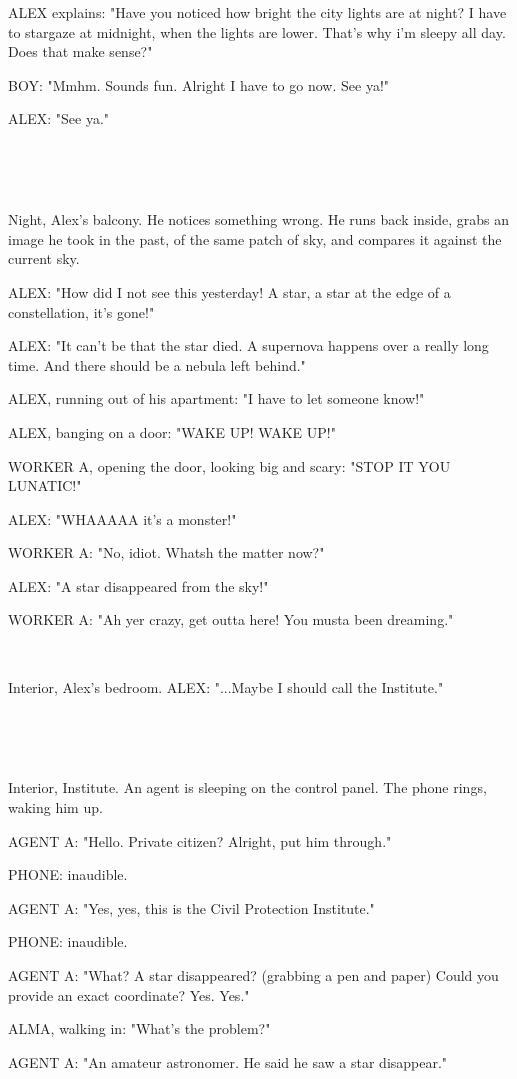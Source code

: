 \documentclass[11pt]{article}
\begin{document}
ALEX explains: "Have you noticed how bright the city lights are at night?
I have to stargaze at midnight, when the lights are lower.
That's why i'm sleepy all day.
Does that make sense?"

BOY: "Mmhm. Sounds fun.
Alright I have to go now. See ya!"

ALEX: "See ya."

\ 

\ 

Night, Alex's balcony.
He notices something wrong.
He runs back inside, grabs an image he took in the past, of the same patch of sky, and compares it against the current sky. 

ALEX: "How did I not see this yesterday!
A star, a star at the edge of a constellation, it's gone!"

ALEX: "It can't be that the star died.
A supernova happens over a really long time.
And there should be a nebula left behind."

ALEX, running out of his apartment: "I have to let someone know!"

ALEX, banging on a door: "WAKE UP! WAKE UP!"

WORKER A, opening the door, looking big and scary: "STOP IT YOU LUNATIC!"

ALEX: "WHAAAAA it's a monster!"

WORKER A: "No, idiot.
Whatsh the matter now?"

ALEX: "A star disappeared from the sky!"

WORKER A: "Ah yer crazy, get outta here!
You musta been dreaming."

\ 

Interior, Alex's bedroom.
ALEX: "...Maybe I should call the Institute."

\ 

\ 

Interior, Institute. 
An agent is sleeping on the control panel.
The phone rings, waking him up.

AGENT A: "Hello. Private citizen? Alright, put him through."

PHONE: inaudible.

AGENT A: "Yes, yes, this is the Civil Protection Institute."

PHONE: inaudible. 

AGENT A: "What? A star disappeared?
(grabbing a pen and paper)
Could you provide an exact coordinate?
Yes. Yes."

ALMA, walking in: "What's the problem?"

AGENT A: "An amateur astronomer. He said he saw a star disappear."
\end{document}
